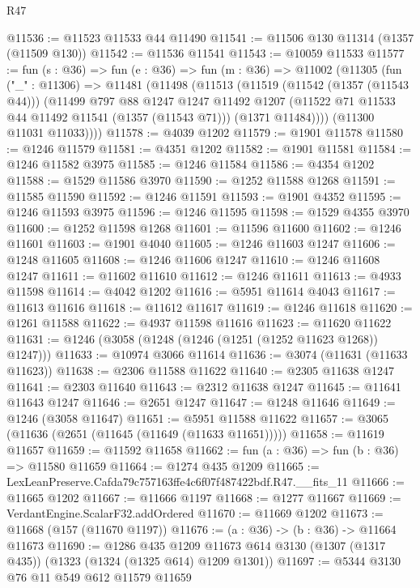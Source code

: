 \begin{lexlean}{R47}
\begin{coremodule}
@11536 := @11523 @11533 @44 @11490
@11541 := @11506 @130 @11314 (@1357 (@11509 @130))
@11542 := @11536 @11541
@11543 := @10059 @11533
@11577 := fun (s : @36) =>
  fun (e : @36) =>
  fun (m : @36) =>
  @11002
    (@11305
      (fun ("_" : @11306) =>
      @11481
        (@11498
          (@11513
            (@11519
              (@11542 (@1357 (@11543 @44)))
              (@11499
                @797
                @88
                @1247
                @1247
                @11492
                @1207
                (@11522 @71 @11533 @44 @11492 @11541 (@1357 (@11543 @71)))
                (@1371 @11484))))
          (@11300 @11031 @11033))))
@11578 := @4039 @1202
@11579 := @1901 @11578
@11580 := @1246 @11579
@11581 := @4351 @1202
@11582 := @1901 @11581
@11584 := @1246 @11582 @3975
@11585 := @1246 @11584
@11586 := @4354 @1202
@11588 := @1529 @11586 @3970
@11590 := @1252 @11588 @1268
@11591 := @11585 @11590
@11592 := @1246 @11591
@11593 := @1901 @4352
@11595 := @1246 @11593 @3975
@11596 := @1246 @11595
@11598 := @1529 @4355 @3970
@11600 := @1252 @11598 @1268
@11601 := @11596 @11600
@11602 := @1246 @11601
@11603 := @1901 @4040
@11605 := @1246 @11603 @1247
@11606 := @1248 @11605
@11608 := @1246 @11606 @1247
@11610 := @1246 @11608 @1247
@11611 := @11602 @11610
@11612 := @1246 @11611
@11613 := @4933 @11598
@11614 := @4042 @1202
@11616 := @5951 @11614 @4043
@11617 := @11613 @11616
@11618 := @11612 @11617
@11619 := @1246 @11618
@11620 := @1261 @11588
@11622 := @4937 @11598 @11616
@11623 := @11620 @11622
@11631 := @1246 (@3058 (@1248 (@1246 (@1251 (@1252 @11623 @1268)) @1247)))
@11633 := @10974 @3066 @11614
@11636 := @3074 (@11631 (@11633 @11623))
@11638 := @2306 @11588 @11622
@11640 := @2305 @11638 @1247
@11641 := @2303 @11640
@11643 := @2312 @11638 @1247
@11645 := @11641 @11643 @1247
@11646 := @2651 @1247
@11647 := @1248 @11646
@11649 := @1246 (@3058 @11647)
@11651 := @5951 @11588 @11622
@11657 := @3065 (@11636 (@2651 (@11645 (@11649 (@11633 @11651)))))
@11658 := @11619 @11657
@11659 := @11592 @11658
@11662 := fun (a : @36) => fun (b : @36) => @11580 @11659
@11664 := @1274 @435 @1209
@11665 := LexLeanPreserve.Cafda79c757163ffe4c6f07f487422bdf.R47.__fits_11
@11666 := @11665 @1202
@11667 := @11666 @1197
@11668 := @1277 @11667
@11669 := VerdantEngine.ScalarF32.addOrdered
@11670 := @11669 @1202
@11673 := @11668 (@157 (@11670 @1197))
@11676 := (a : @36) -> (b : @36) -> @11664 @11673
@11690 := @1286
    @435
    @1209
    @11673
    @614
    @3130
    (@1307 (@1317 @435))
    (@1323 (@1324 (@1325 @614) @1209 @1301))
@11697 := @5344 @3130 @76 @11 @549 @612 @11579 @11659

\end{coremodule}
\end{lexlean}
